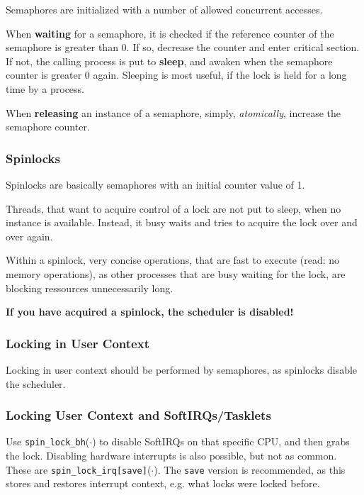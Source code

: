 \documentclass[english]{panikzettel}
\newcommand{\fkt}[1]{\texttt{#1}(\(\cdot\))}
\newcommand{\alert}[1]{\textbf{\textcolor{red!75!black}{#1}}}
\begin{document}
	Semaphores are initialized with a number of allowed concurrent accesses.

	When \textbf{waiting} for a semaphore, it is checked if the reference counter of the semaphore is greater than 0. 
	If so, decrease the counter and enter critical section. 
	If not, the calling process is put to \textbf{sleep}, and awaken when the semaphore counter is greater 0 again.
	Sleeping is most useful, if the lock is held for a long time by a process.

	When \textbf{releasing} an instance of a semaphore, simply, \textit{atomically}, increase the semaphore counter.	
	
	\subsubsection{Spinlocks}
	\label{sss:sleeping-and-locking:spinlocks}

	Spinlocks are basically semaphores with an initial counter value of 1. 

	Threads, that want to acquire control of a lock are not put to sleep, when no instance is available. 
	Instead, it busy waits and tries to acquire the lock over and over again. 

	Within a spinlock, very concise operations, that are fast to execute (read: no memory operations), as other processes that are busy waiting for the lock, are blocking ressources unnecessarily long.

	\alert{If you have acquired a spinlock, the scheduler is disabled!} 

	\subsubsection{Locking in User Context}
	\label{sss:sleeping-and-locking:locking-in-user-context}
	
	Locking in user context should be performed by semaphores, as spinlocks disable the scheduler. 
	
	\subsubsection{Locking User Context and SoftIRQs/Tasklets}
	\label{sss:sleeping-and-locking:locking-user-context-and-softirqs/tasklets}
	
	Use \fkt{spin\_lock\_bh} to disable SoftIRQs on that specific CPU, and then grabs the lock. 
	Disabling hardware interrupts is also possible, but not as common.
	These are \fkt{spin\_lock\_irq[save]}. The  \texttt{save} version is recommended, as this stores and restores interrupt context, e.g. what locks were locked before.   
\end{document}
